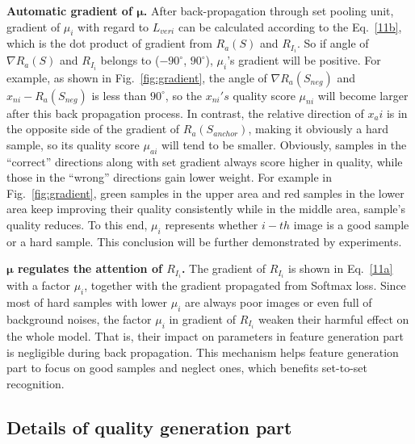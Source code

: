 \documentclass[10pt,twocolumn,letterpaper]{article}
\begin{document}
\textbf{Automatic gradient of $\mathbf{\mu}$.}
After back-propagation through set pooling unit, gradient of $\mu_i$ with regard to $L_{veri}$ can be calculated according to the Eq.~\ref{11b}, which is the dot product of gradient from $R_a(S)$ and $R_{I_i}$. So if angle of $\nabla R_a(S)$ and $R_{I_i}$ belongs to ($-90^{\circ}$, $90^{\circ}$), $\mu_i$'s gradient will be positive. For example, as shown in Fig.~\ref{fig:gradient}, the angle of $\nabla R_a(S_{neg})$ and $x_{ni}-R_a(S_{neg})$ is less than $90^{\circ}$, so the $x_{ni}'s$ quality score $\mu_{ni}$ will become larger after this back propagation process. In contrast, the relative direction of $x_ai$ is in the opposite side of the gradient of $R_a(S_{anchor})$, making it obviously a hard sample, so its quality score $\mu_{ai}$ will tend to be smaller. Obviously, samples in the ``correct'' directions along with set gradient  always score higher in quality, while those in the ``wrong'' directions gain lower weight. For example in Fig.~\ref{fig:gradient}, green samples in the upper area and red samples in the lower area keep improving their quality consistently while in the middle area, sample's quality reduces. To this end, $\mu_i$ represents whether $i-th$ image is a good sample or a hard sample. This conclusion will be further demonstrated by experiments.

\textbf{$\mathbf{\mu}$ regulates the attention of $R_{I_i}$.}
The gradient of $R_{I_i}$ is shown in Eq.~\ref{11a} with a factor  $\mu_i$, together with the gradient propagated from Softmax loss. Since most of hard samples with lower $\mu_i$ are always poor images or even full of background noises, the factor $\mu_i$ in gradient of  $R_{I_i}$ weaken their harmful effect on the whole model. That is, their impact on parameters in feature generation part is negligible during back propagation. This mechanism helps feature generation part to focus on good samples and neglect ones, which benefits set-to-set recognition.























\subsection{Details of quality generation part}
\label{details_qgp}
\end{document}
